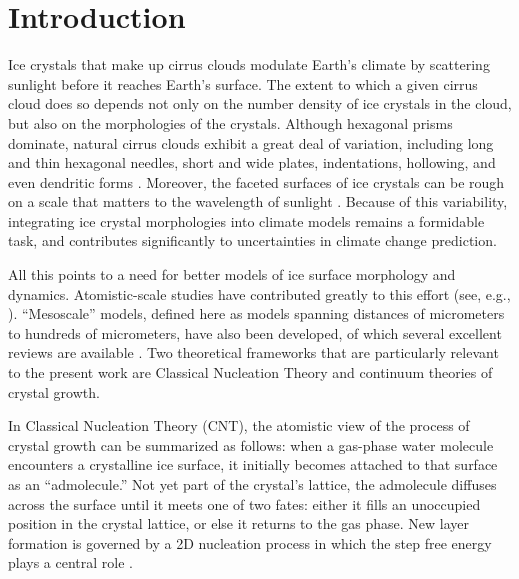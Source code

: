 \documentclass[draft]{agujournal2019}
\begin{document}


%
%


\section{Introduction}
Ice crystals that make up cirrus clouds modulate Earth’s climate by scattering sunlight before it reaches Earth’s surface. The extent to which a given cirrus cloud does so depends not only on the number density of ice crystals in the cloud, but also on the morphologies of the crystals. Although hexagonal prisms dominate, natural cirrus clouds exhibit a great deal of variation, including long and thin hexagonal needles, short and wide plates, indentations, hollowing, and even dendritic forms \cite{nakaya_snow_1954,libbrecht_formation_2007}. Moreover, the faceted surfaces of ice crystals can be rough on a scale that matters to the wavelength of sunlight  \cite{jarvinen_ice_2023}. Because of this variability, integrating ice crystal morphologies into climate models remains a formidable task, and contributes significantly to uncertainties in climate change prediction.

All this points to a need for better models of ice surface morphology and dynamics. Atomistic-scale studies have contributed greatly to this effort (see, e.g., \cite{llombart_surface_2020}). ``Mesoscale'' models, defined here as models spanning distances of micrometers to hundreds of micrometers, have also been developed, of which several excellent reviews are available \cite{harrington_approximate_2021,feigelson_50_2004,feigelson_crystal_2022}. Two theoretical frameworks that are particularly relevant to the present work are Classical Nucleation Theory and continuum theories of crystal growth.

In Classical Nucleation Theory (CNT), the atomistic view of the process of crystal growth can be summarized as follows: when a gas-phase water molecule encounters a crystalline ice surface, it initially becomes attached to that surface as an “admolecule.” Not yet part of the crystal’s lattice, the admolecule diffuses across the surface until it meets one of two fates: either it fills an unoccupied position in the crystal lattice, or else it returns to the gas phase. New layer formation is governed by a 2D nucleation process in which the step free energy plays a central role \cite{kuroda_growth_1982}.
\end{document}
